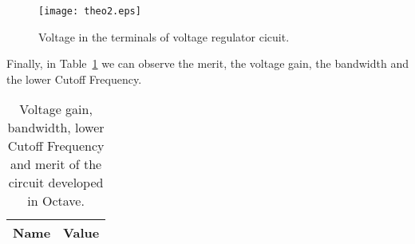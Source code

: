 
\begin{figure}[H] \centering
\texttt{[image: theo2.eps]}
\caption{Voltage in the terminals of voltage regulator cicuit.}
\label{fig:theo2}
\end{figure}

Finally, in Table~\ref{tab:merit} we can observe the merit, the voltage gain, the bandwidth and the lower Cutoff Frequency.

\begin{table}[H]
  \centering
  \begin{tabular}{|l|r|}
    \hline    
    {\bf Name} & {\bf Value} \\ \hline
	
  \end{tabular}
  \caption{Voltage gain, bandwidth, lower Cutoff Frequency and merit of the circuit developed in Octave.}
  \label{tab:merit}
\end{table}
